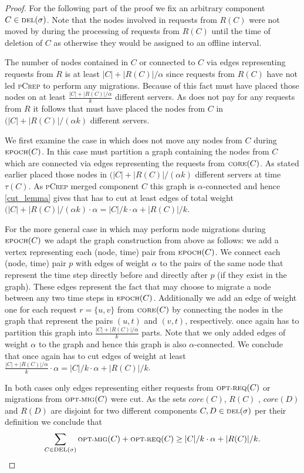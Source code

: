 \documentclass[a4paper,UKenglish,cleveref, autoref, thm-restate,authorcolumns]{lipics-v2019}
\newcommand{\adjDel}{\textsc{pCrep}}
\newcommand{\optmig}{\text{\scriptsize OPT-MIG}}
\newcommand{\optreq}{\text{\scriptsize OPT-REQ}}
\newcommand{\del}{\text{\scriptsize DEL}}
\newcommand{\opt}{\text{O{\scriptsize PT}}}
\newcommand{\core}{\text{\scriptsize CORE}}
\newcommand{\epoch}{\text{\scriptsize EPOCH}}
\begin{document}
\begin{proof}
	For the following part of the proof we fix an arbitrary component $C\in\del{}(\sigma)$. Note that the nodes involved in requests from $R(C)$ were not moved by \opt{} during the processing of requests from $R(C)$ until the time of deletion of $C$ as otherwise they would be assigned to an offline interval.
	
	The number of nodes contained in $C$ or connected to $C$ via edges representing requests from $R$ is at least $|C|+|R(C)|/\alpha$ since requests from $R(C)$ have not led \adjDel{} to perform any migrations. Because of this fact \opt{} must have placed those nodes on at least $\frac{|C|+|R(C)|/\alpha}{k}$ different servers. As \opt{} does not pay for any requests from $R$ it follows that \opt{} must have placed the nodes from $C$ in $(|C|+|R(C)|/(\alpha k)$ different servers.
	
	We first examine the case in which \opt{} does not move any nodes from $C$ during $\epoch(C)$. In this case \opt{} must partition a graph containing the nodes from $C$ which are connected via edges representing the requests from $\core(C)$. As stated earlier \opt{} placed those nodes in $(|C|+|R(C)|/(\alpha k)$ different servers at time $\tau(C)$. As \adjDel{} merged component $C$ this graph is $\alpha$-connected and hence \cref{cut_lemma} gives that \opt{} has to cut at least edges of total weight $(|C|+|R(C)|/(\alpha k)\cdot\alpha=|C|/k\cdot\alpha+|R(C)|/k$.
	
	For the more general case in which \opt{} may perform node migrations during $\epoch(C)$ we adapt the graph construction from above as follows: we add a vertex representing each (node, time) pair from $\epoch(C)$.
	We connect each (node, time) pair $p$ with edges of weight $\alpha$ to the pairs of the same node that represent the time step directly before and directly after $p$ (if they exist in the graph). These edges represent the fact that \opt{} may choose to migrate a node between any two time steps in $\epoch(C)$.
	Additionally we add an edge of weight one for each request $r=\{u,v\}$ from $\core(C)$ by connecting the nodes in the graph that represent the pairs $(u,t)$ and $(v,t)$, respectively. \opt{} once again has to partition this graph into $\frac{|C|+|R(C)|/\alpha}{k}$ parts.
	Note that we only added edges of weight $\alpha$ to the graph and hence this graph is also $\alpha$-connected. We conclude that once again \opt{} has to cut edges of weight at least $\frac{|C|+|R(C)|/\alpha}{k}\cdot\alpha=|C|/k\cdot\alpha+|R(C)|/k$.
	
	In both cases only edges representing either requests from $\optreq(C)$ or migrations from $\optmig(C)$ were cut.
	As the sets $core(C)$, $R(C)$ , $core(D)$ and $R(D)$ are disjoint for two different components $C,D\in\del(\sigma)$ per their definition we conclude that
	\begin{align*}
	\sum_{C\in\del(\sigma)}\optmig(C)+\optreq(C)\geq |C|/k\cdot\alpha+|R(C)|/k.
	\end{align*}
\end{proof}
\end{document}
